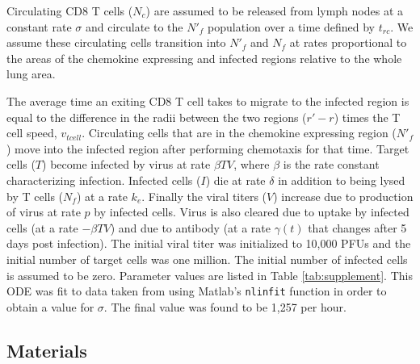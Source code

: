 \documentclass[preprint,10pt,numbers]{elsarticle}
\begin{document}
Circulating CD8 T cells ($N_{c}$) are assumed to be released from lymph nodes at a constant rate $\sigma$ and circulate to the $N'_{f}$ population over a time defined by $t_{rc}$. We assume these circulating cells transition into $N'_{f}$ and $N_{f}$ at rates proportional to the areas of the chemokine expressing and infected regions relative to the whole lung area. 

The average time an exiting CD8 T cell takes to migrate to the infected region is equal to the difference in the radii between the two regions ($r' - r$) times the T cell speed, $v_{tcell}$.  Circulating cells that are in the chemokine expressing region ($N'_{f}$) move into the infected region after performing chemotaxis for that time. Target cells ($T$) become infected by virus at rate $\beta TV$, where $\beta$ is the rate constant characterizing infection. Infected cells ($I$) die at rate $\delta$ in addition to being lysed by T cells ($N_{f}$) at a rate $k_{e}$. Finally the viral titers ($V$) increase due to production of virus at rate $p$ by infected cells. Virus is also cleared due to uptake by infected cells (at a rate $- \beta TV$) and due to antibody (at a rate $\gamma (t)$ that changes after 5 days post infection). The initial viral titer was initialized to 10,000 PFUs and the initial number of target cells was one million. The initial number of infected cells is assumed to be zero. Parameter values are listed in Table \ref{tab:supplement}.  This ODE was fit to data taken from \citep{Miao2010a} using Matlab's \texttt{nlinfit} function in order to obtain a value for $\sigma$.  The final value was found to be 1,257 per hour.


\subsection*{Materials}
\end{document}
